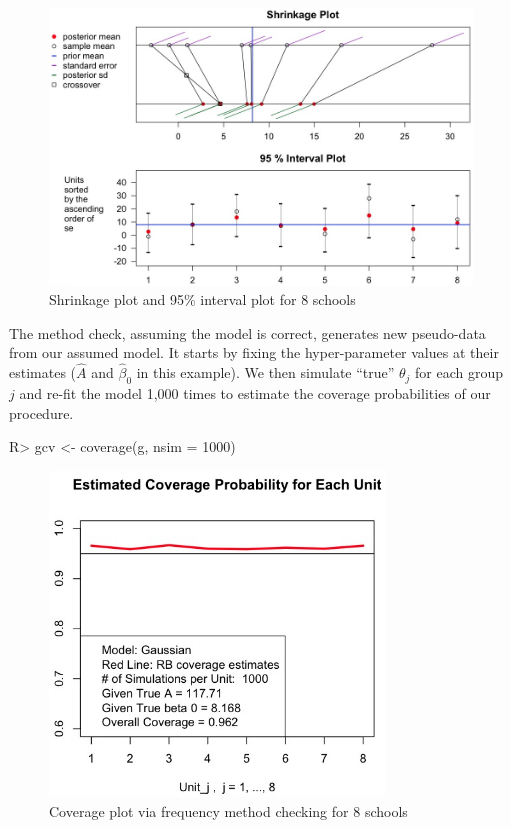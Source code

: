 \documentclass[article]{jss}
\begin{document}
\begin{figure}[h] 
\begin{center}
\includegraphics[width = 6in]{school1.png}
\caption{Shrinkage plot and 95\% interval plot for 8 schools}
\label{fig:8schoolsplot}
\end{center}
\end{figure}


The method check, assuming the model is correct, generates new pseudo-data from our assumed model. It starts by fixing the hyper-parameter values at their estimates ($\hat{A}$ and $\hat{\beta}_0$ in this example). We then simulate ``true'' $\theta_j$ for each group $j$ and re-fit the model 1,000 times to estimate the coverage probabilities of our procedure.  

\begin{CodeChunk}
\begin{CodeInput}
R> gcv <- coverage(g, nsim = 1000)
\end{CodeInput}
\end{CodeChunk}
\begin{figure}[h] 
\begin{center}
\includegraphics[width = 3.5in]{school2.png}
\caption{Coverage plot via frequency method checking for 8 schools}
\label{fig:schoolcoverage}
\end{center}
\end{figure}
\end{document}
